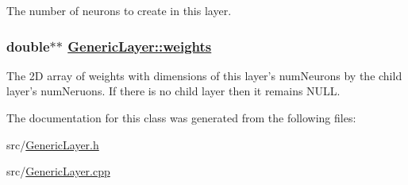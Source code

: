 The number of neurons to create in this layer. \hypertarget{classGenericLayer_e75dc38537415bb12a60fbbbbb4b3d75}{
\subsubsection[weights]{\setlength{\rightskip}{0pt plus 5cm}double$\ast$$\ast$ \hyperlink{classGenericLayer_e75dc38537415bb12a60fbbbbb4b3d75}{Generic\-Layer::weights}}}
\label{classGenericLayer_e75dc38537415bb12a60fbbbbb4b3d75}


The 2D array of weights with dimensions of this layer's num\-Neurons by the child layer's num\-Neruons. If there is no child layer then it remains NULL. 

The documentation for this class was generated from the following files:\begin{CompactItemize}
\item 
src/\hyperlink{GenericLayer_8h}{Generic\-Layer.h}\item 
src/\hyperlink{GenericLayer_8cpp}{Generic\-Layer.cpp}\end{CompactItemize}
